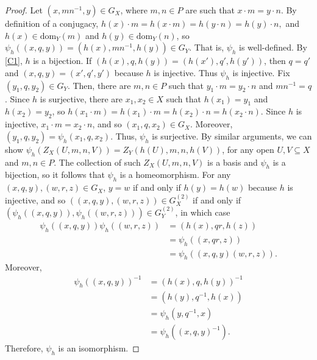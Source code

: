 \documentclass[11pt]{amsart}
\theoremstyle{definition}
\numberwithin{thm}{section}
\numberwithin{equation}{section}
\newcommand{\RPA}[2]{#1 \cdot #2}
\newcommand{\RPAdom}[2]{\textrm{dom}_{#1}(#2)}
\newcommand{\SDPG}[1]{G_{#1}}
\newcommand{\SDPGcylinder}[5]{Z_{#1}(#2,#3,#4,#5)}
\newcommand{\composablepairs}[1]{#1^{(2)}}
\begin{document}
\begin{proof}
Let $(x, mn^{-1}, y) \in \SDPG{X}$, where $m, n \in P$ are such that $\RPA{x}{m} = \RPA{y}{n}$.
By definition of a conjugacy, 
\(
\RPA{h(x)}{m} 
= h(\RPA{x}{m}) 
= h(\RPA{y}{n}) 
= \RPA{h(y)}{n},
\)
and $h(x) \in \RPAdom{Y}{m}$ and $h(y) \in \RPAdom{Y}{n}$, so $\psi_h((x, q, y)) = (h(x), mn^{-1}, h(y)) \in \SDPG{Y}$.
That is, $\psi_h$ is well-defined.
By \ref{C1}, $h$ is a bijection.
If $(h(x), q, h(y)) = (h(x'), q', h(y'))$, then $q=q'$ and  $(x, q, y) = (x', q', y')$ because $h$ is injective. 
Thus $\psi_h$ is injective. 
Fix $(y_1, q, y_2) \in \SDPG{Y}$.
Then, there are $m, n \in P$ such that $\RPA{y_1}{m} = \RPA{y_2}{n}$ and $mn^{-1} = q$.
Since $h$ is surjective, there are $x_1, x_2 \in X$ such that $h(x_1) = y_1$ and $h(x_2) = y_2$, so 
\(
h(\RPA{x_1}{m}) 
= \RPA{h(x_1)}{m} 
= \RPA{h(x_2)}{n} 
= h(\RPA{x_2}{n}).
\)
Since $h$ is injective, $\RPA{x_1}{m} = \RPA{x_2}{n}$, and so $(x_1, q, x_2) \in \SDPG{X}$.
Moreover, $(y_1, q, y_2) = \psi_h(x_1, q, x_2)$. 
Thus, $\psi_h$ is surjective.
By similar arguments, we can show $\psi_h(\SDPGcylinder{X}{U}{m}{n}{V}) = \SDPGcylinder{Y}{h(U)}{m}{n}{h(V)}$, for any open $U, V \subseteq X$ and $m, n \in P$.
The collection of such $\SDPGcylinder{X}{U}{m}{n}{V}$ is a basis and $\psi_h$ is a bijection, so it follows that $\psi_h$ is a homeomorphism.
For any $(x, q, y), (w, r, z) \in \SDPG{X}$, $y = w$ if and only if $h(y) = h(w)$ because $h$ is injective, and so $((x, q, y), (w, r, z)) \in \composablepairs{\SDPG{X}}$ if and only if $(\psi_h((x, q, y)), \psi_h((w, r, z))) \in \composablepairs{\SDPG{Y}}$, in which case 
\begin{equation*}
\begin{aligned}
\psi_h((x, q, y))\psi_h((w, r, z)) 
&= (h(x), qr, h(z)) \\
&= \psi_h((x, qr, z)) \\
&= \psi_h((x, q, y)(w, r, z)).
\end{aligned}
\end{equation*}
Moreover, 
\begin{equation*}
\begin{aligned}
\psi_h((x, q, y))^{-1}
&= (h(x), q, h(y))^{-1} \\
&= (h(y), q^{-1}, h(x)) \\
&= \psi_h(y, q^{-1}, x) \\
&= \psi_h((x, q, y)^{-1}).
\end{aligned}
\end{equation*}
Therefore, $\psi_h$ is an isomorphism.


\end{proof}
\end{document}
